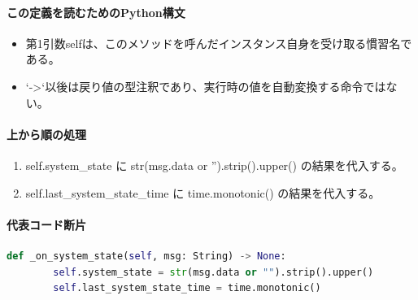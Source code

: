 \documentclass[a4paper,11pt]{article}
\begin{document}
            \paragraph{この定義を読むためのPython構文}
            \begin{itemize}[leftmargin=1.6em]
            \item 第1引数selfは、このメソッドを呼んだインスタンス自身を受け取る慣習名である。
\item `->`以後は戻り値の型注釈であり、実行時の値を自動変換する命令ではない。
            \end{itemize}
            \paragraph{上から順の処理}
            \begin{enumerate}[leftmargin=1.8em]
            \item self.system\_state に str(msg.data or '').strip().upper() の結果を代入する。
\item self.last\_system\_state\_time に time.monotonic() の結果を代入する。
            \end{enumerate}
            \paragraph{代表コード断片}
            \begin{lstlisting}[language=Python]
    def _on_system_state(self, msg: String) -> None:
        self.system_state = str(msg.data or "").strip().upper()
        self.last_system_state_time = time.monotonic()
\end{lstlisting}
\end{document}
